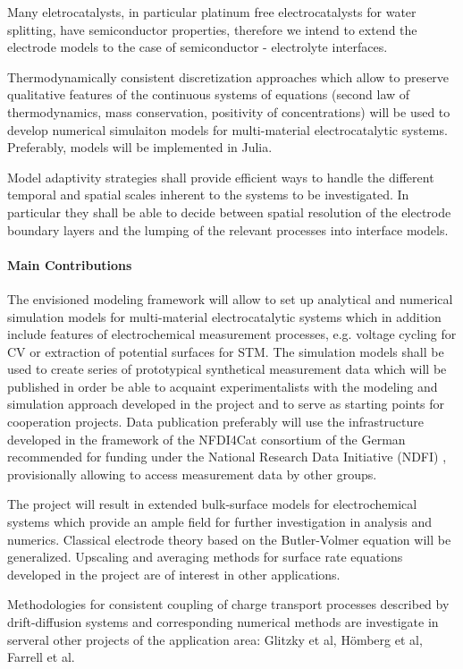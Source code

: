 \documentclass[a4paper,10pt]{article}
\begin{document}
Many eletrocatalysts, in particular platinum free electrocatalysts for water splitting, have semiconductor properties, therefore we intend to extend the electrode models to the case of semiconductor - electrolyte interfaces.

Thermodynamically consistent discretization approaches which allow to preserve qualitative features of the continuous systems of equations  (second law of thermodynamics, mass conservation, positivity of concentrations) will be used to  develop numerical simulaiton models for multi-material electrocatalytic systems.  Preferably, models will be implemented in  Julia.

Model adaptivity strategies shall provide efficient ways to handle the different temporal and spatial scales inherent to the systems to be investigated. In particular they shall be able to decide between spatial resolution of the electrode boundary layers and the lumping of the relevant processes into interface models.


\paragraph{Main Contributions}
The envisioned modeling framework will allow to set up analytical and numerical simulation models for multi-material electrocatalytic systems  which in addition include features of electrochemical measurement processes, e.g. voltage cycling for CV or extraction of potential surfaces for STM.
The simulation  models shall be used to create series of prototypical synthetical measurement data which will be published in order be able to acquaint experimentalists with the modeling and simulation approach developed in the project and to serve as starting points for cooperation projects. Data publication preferably will  use the infrastructure developed in the framework of the NFDI4Cat consortium of the German recommended for funding under the National Research Data Initiative (NDFI) \cite{NFDI4Cat}, provisionally allowing to access measurement data by other groups.

The project will result in extended bulk-surface models for electrochemical systems which provide an ample field for further investigation in analysis and numerics. 
Classical electrode theory based on the Butler-Volmer equation will be generalized.  Upscaling and averaging methods for surface rate equations developed in the project are of interest in other applications.

Methodologies for consistent coupling of charge transport processes described by drift-diffusion systems and
corresponding numerical methods are investigate  in serveral other projects of the application area: Glitzky et al, Hömberg et al, Farrell et al.
\end{document}
